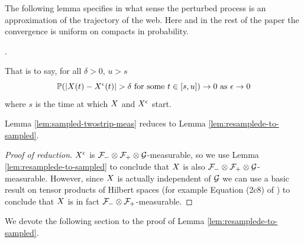 {The following lemma specifies in what sense the perturbed process is
an approximation of the trajectory of the web.
Here and in the rest of the paper the convergence is uniform
on compacts in probability.

\begin{lemma}
  \label{lem:resamplede-to-sampled}
  \statementoflemresampledetosampled.
\end{lemma}
That is to say, for all $\delta > 0$, $u > s$
\[
\mathbb{P}(|X(t) - X^{\epsilon}(t)| > \delta \text{ for some } t \in
  [s, u]) \to 0 \text{ as } \epsilon \to 0
\]
where $s$ is the time at which $X$ and $X^{\epsilon}$ start.

Lemma \ref{lem:sampled-twostrip-meas} reduces to Lemma
\ref{lem:resamplede-to-sampled}.

\begin{proof}[Proof of reduction]
  $X^{\epsilon}$ is $\mathcal{F}_{-} \otimes \mathcal{F}_{+} \otimes \mathcal{G}$-measurable, so we use Lemma
  \ref{lem:resamplede-to-sampled} to conclude that $X$ is also
  $\mathcal{F}_{-} \otimes \mathcal{F}_{+} \otimes \mathcal{G}$-measurable.  However, since $X$ is
  actually independent of $\mathcal{G}$ we can use a basic result on
  tensor products of Hilbert spaces (for example Equation (2c8) of
  \cite{tsirelson-noise-as-a-boolean-algebra}) to conclude that $X$ is
  in fact $\mathcal{F}_{-} \otimes \mathcal{F}_{+}$-measurable.
\end{proof}

We devote the following section to the proof of Lemma
\ref{lem:resamplede-to-sampled}.
}
